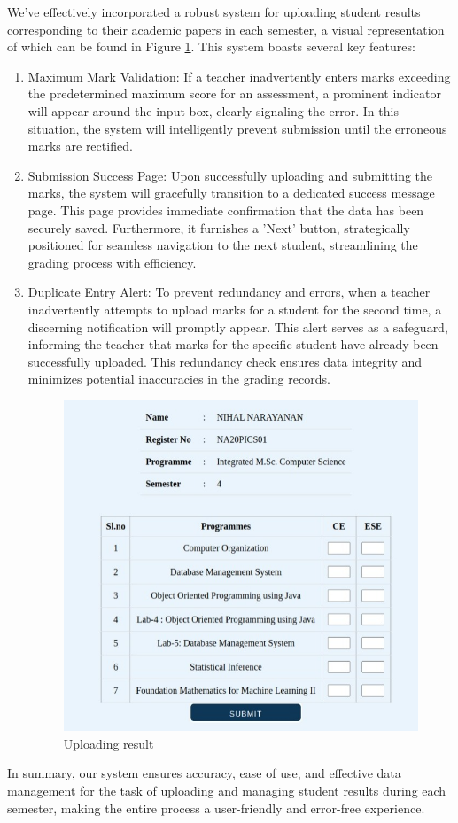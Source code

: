 \documentclass{nascproject}
\begin{document}
We've effectively incorporated a robust system for uploading student results corresponding to their academic papers in each semester, a visual representation of which can be found in Figure \ref{upload}. This system boasts several key features:
\begin{enumerate}
	\item Maximum Mark Validation: If a teacher inadvertently enters marks exceeding the predetermined maximum score for an assessment, a prominent indicator will appear around the input box, clearly signaling the error. In this situation, the system will intelligently prevent submission until the erroneous marks are rectified.
	\item Submission Success Page: Upon successfully uploading and submitting the marks, the system will gracefully transition to a dedicated success message page. This page provides immediate confirmation that the data has been securely saved. Furthermore, it furnishes a 'Next' button, strategically positioned for seamless navigation to the next student, streamlining the grading process with efficiency.
	\item Duplicate Entry Alert: To prevent redundancy and errors, when a teacher inadvertently attempts to upload marks for a student for the second time, a discerning notification will promptly appear. This alert serves as a safeguard, informing the teacher that marks for the specific student have already been successfully uploaded. This redundancy check ensures data integrity and minimizes potential inaccuracies in the grading records.\\

  \begin{figure}[H]
	\centering
	\includegraphics[scale=0.5]{upload1.jpeg}
	\caption{Uploading result}
	\label{upload}
\end{figure}
\end{enumerate}
	In summary, our system ensures accuracy, ease of use, and effective data management for the task of uploading and managing student results during each semester, making the entire process a user-friendly and error-free experience.
\end{document}
